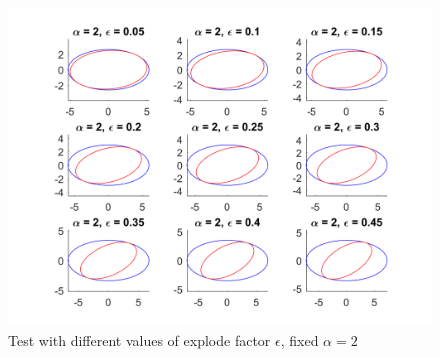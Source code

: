 \documentclass{article}
\begin{document}
\begin{figure}
\centering
\includegraphics[scale = 0.4]{fig/closed-form_maxAngle-test_epsilon.png}
\caption{Test with different values of explode factor $\epsilon$, fixed $\alpha = 2$}
\label{diff-epi}
\end{figure}
\end{document}
